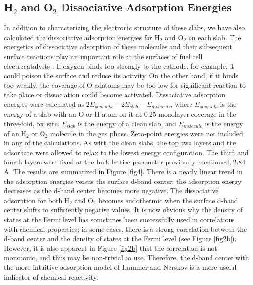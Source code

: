 \documentclass[aps,preprint,superscriptaddress,endfloats*]{revtex4}
\begin{document}
\subsection{H$_2$ and O$_2$ Dissociative Adsorption Energies}
In addition to characterizing the electronic structure of these slabs,
we have also calculated the dissociative adsorption energies for H$_2$
and O$_2$ on each slab.  The energetics of dissociative adsorption of
these molecules and their subsequent surface reactions play an
important role at the surfaces of fuel cell electrocatalysts
\cite{markovic2002:_surfac_scien}.  If oxygen binds too strongly to
the cathode, for example, it could poison the surface and reduce its
activity.  On the other hand, if it binds too weakly, the coverage of
O adatoms may be too low for significant reaction to take place or
dissociation could become activated.
%
Dissociative adsorption energies were calculated as \(2 E_{slab,ads}-2
E_{slab} -E_{molecule}\), where $E_{slab,ads}$ is the energy of a slab
with an O or H atom on it at 0.25 monolayer coverage in the
three-fold, fcc site. $E_{slab}$ is the energy of a clean slab, and
$E_{molecule}$ is the energy of an H$_2$ or O$_2$ molecule in the gas
phase. Zero-point energies were not included in any of the
calculations.  As with the clean slabs, the top two layers and the
adsorbate were allowed to relax to the lowest energy configuration.
The third and fourth layers were fixed at the bulk lattice parameter
previously mentioned, 2.84 \AA.  The results are summarized in Figure
\ref{fig4}.  There is a nearly linear trend in the adsorption energies
versus the surface d-band center; the adsorption energy decreases as
the d-band center becomes more negative.  The dissociative adsorption
for both H$_2$ and O$_2$ becomes endothermic when the surface d-band
center shifts to sufficiently negative values. It is now obvious why
the density of states at the Fermi level has sometimes been
successfully used in correlations with chemical properties; in some
cases, there is a strong correlation between the d-band center and the
density of states at the Fermi level (see Figure \ref{fig2b}).
However, it is also apparent in Figure \ref{fig2b} that the
correlation is not monotonic, and thus may be non-trivial to use.
Therefore, the d-band center with the more intuitive adsorption model
of Hammer and N{\o}rskov is a more useful indicator of chemical
reactivity.
\end{document}
